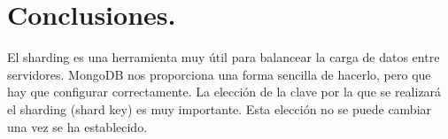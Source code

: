 \section{Conclusiones.}


El sharding es una herramienta muy útil para balancear la carga de datos entre servidores. MongoDB nos proporciona una forma sencilla de hacerlo, pero que hay que configurar correctamente. La elección de la clave por la que se realizará el sharding (shard key) es muy importante. Esta elección no se puede cambiar una vez se ha establecido.